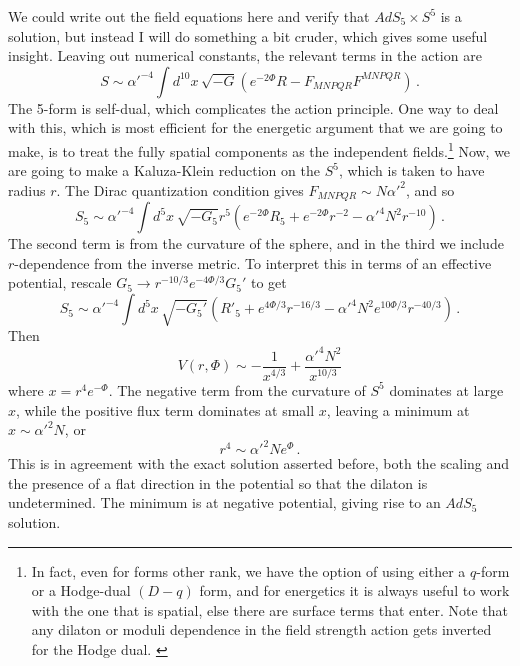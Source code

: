 \documentclass[12pt]{article}
\begin{document}
{We could write out the field equations here and verify that $AdS_5 \times S^5$ is a solution, but instead I will do something a bit cruder, which gives some useful insight.  Leaving out numerical constants, the relevant terms in the action are
\begin{equation}
S \sim {\alpha'^{-4}} \int d^{10}x \, \sqrt{-G} ( e^{-2\Phi} R - F_{MNPQR} F^{MNPQR} ) \,.
\end{equation}
The 5-form is self-dual, which complicates the action principle.  One way to deal with this, which is most efficient for the energetic argument that we are going to make, is to treat the fully spatial components as the independent fields.\footnote{In fact, even for forms other rank, we have the option of using either a $q$-form or a Hodge-dual $(D-q)$ form, and for energetics it is always useful to work with the one that is spatial, else there are surface terms that enter.  Note that any dilaton or moduli dependence in the field strength action gets inverted for the Hodge dual. \label{fnhodge}}  Now, we are going to make a Kaluza-Klein reduction on the $S^5$, which is taken to have radius $r$.  The Dirac quantization condition gives $F_{MNPQR} \sim N \alpha'^2$, and so 
\begin{equation}
S_5 \sim {\alpha'^{-4}} \int d^{5}x \, \sqrt{-G_5} r^5 ( e^{-2\Phi} R_5 + e^{-2\Phi} r^{-2} -  \alpha'^4 N^2 r^{-10}) \,.
\end{equation}
The second term is from the curvature of the sphere, and in the third we include $r$-dependence from the inverse metric.  To interpret this in terms of an effective potential, rescale $G_5 \to r^{-10/3} e^{-4\Phi/3} G_5'$ to get
\begin{equation}
S_5 \sim {\alpha'^{-4}} \int d^{5}x \, \sqrt{-G_5'} ( R'_5 + e^{4\Phi/3} r^{-16/3} -  \alpha'^4 N^2 e^{10 \Phi/3} r^{-40/3} ) \,.
\end{equation}
Then 
\begin{equation}
V(r,\Phi) \sim - \frac{1}{x^{4/3}} + \frac{\alpha'^4 N^2}{x^{10/3}}
\end{equation}
where $x = r^4 e^{-\Phi}$.  The negative term from the curvature of $S^5$ dominates at large $x$, while the positive flux term dominates at small $x$, leaving a minimum at $x \sim \alpha'^2 N$, or
\begin{equation}
r^4 \sim \alpha'^2 N e^{\Phi} \,.
\end{equation}
This is in agreement with the exact solution asserted before, both the scaling and the presence of a flat direction in the potential so that the dilaton is undetermined.  The minimum is at negative potential, giving rise to an $AdS_5$ solution.

}
\end{document}

